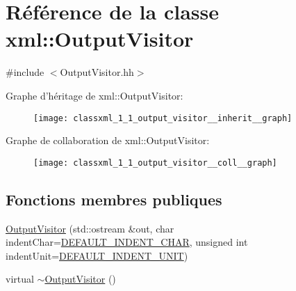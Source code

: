 \hypertarget{classxml_1_1_output_visitor}{
\section{Référence de la classe xml::OutputVisitor}
\label{classxml_1_1_output_visitor}
}


{\ttfamily \#include $<$OutputVisitor.hh$>$}



Graphe d'héritage de xml::OutputVisitor:\nopagebreak
\begin{figure}[H]
\begin{center}
\leavevmode
\texttt{[image: classxml\_1\_1\_output\_visitor\_\_inherit\_\_graph]}
\end{center}
\end{figure}


Graphe de collaboration de xml::OutputVisitor:\nopagebreak
\begin{figure}[H]
\begin{center}
\leavevmode
\texttt{[image: classxml\_1\_1\_output\_visitor\_\_coll\_\_graph]}
\end{center}
\end{figure}
\subsection*{Fonctions membres publiques}
\begin{DoxyCompactItemize}
\item 
\hyperlink{classxml_1_1_output_visitor_a09e8e0dd6ac2bbbf39cab4fa79a65a4b}{OutputVisitor} (std::ostream \&out, char indentChar=\hyperlink{classxml_1_1_output_visitor_ad61c526a1962865b37f22fdf252b63f3}{DEFAULT\_\-INDENT\_\-CHAR}, unsigned int indentUnit=\hyperlink{classxml_1_1_output_visitor_aa5e9426f0fdf70d3e0922837c8c99f93}{DEFAULT\_\-INDENT\_\-UNIT})
\item 
virtual \hyperlink{classxml_1_1_output_visitor_a6143fdb2f73ab2bafa7f2b3e3c32e48a}{$\sim$OutputVisitor} ()
\end{DoxyCompactItemize}
